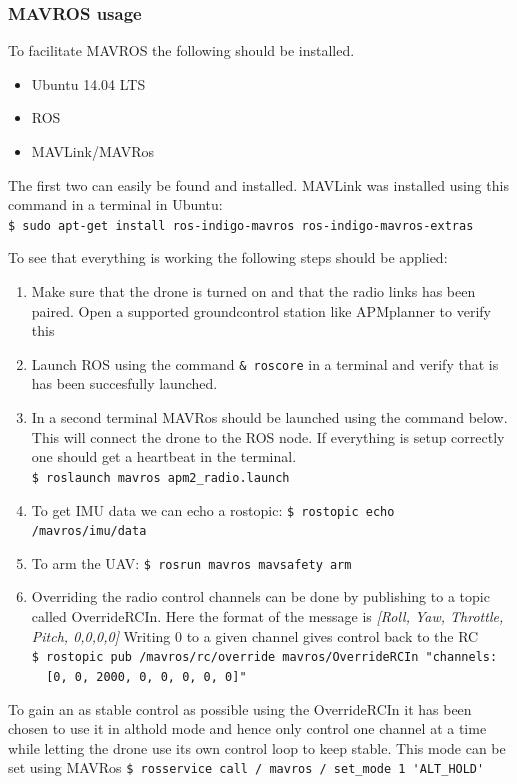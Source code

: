 \subsubsection{MAVROS usage}
To facilitate MAVROS the following should be installed.
\begin{itemize}
	\item Ubuntu 14.04 LTS
	\item ROS
	\item MAVLink/MAVRos
\end{itemize}

The first two can easily be found and installed. MAVLink was installed using this command in a terminal in Ubuntu:\\
\verb|$ sudo apt-get install ros-indigo-mavros ros-indigo-mavros-extras|

To see that everything is working the following steps should be applied:
\begin{enumerate}
\item Make sure that the drone is turned on and that the radio links has been paired. Open a supported groundcontrol station like APMplanner to verify this 
\item Launch ROS using the command \verb|& roscore| in a terminal and verify that is has been succesfully launched.
\item In a second terminal MAVRos should be launched using the command below. This will connect the drone to the ROS node. If everything is setup correctly one should get a heartbeat in the terminal.\\
\verb|$ roslaunch mavros apm2_radio.launch|
\item To get IMU data we can echo a rostopic:
\verb|$ rostopic echo /mavros/imu/data|
\item To arm the UAV:
\verb|$ rosrun mavros mavsafety arm|
\item Overriding the radio control channels can be done by publishing to a topic called OverrideRCIn. Here the format of the message is \emph{[Roll, Yaw, Throttle, Pitch, 0,0,0,0]} Writing 0 to a given channel gives control back to the RC\\
\verb|$ rostopic pub /mavros/rc/override mavros/OverrideRCIn "channels:|\\
\verb|  [0, 0, 2000, 0, 0, 0, 0, 0]"|
\end{enumerate}

To gain an as stable control as possible using the OverrideRCIn it has been chosen to use it in althold mode and hence only control one channel at a time while letting the drone use its own control loop to keep stable. This mode can be set using MAVRos
\verb|$ rosservice call / mavros / set_mode 1 'ALT_HOLD'|

